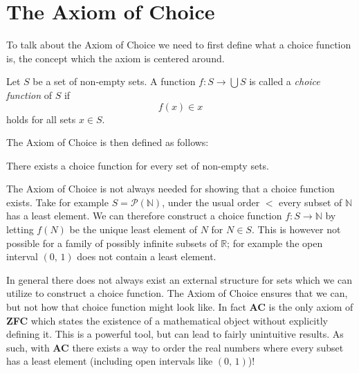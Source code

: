 \documentclass[../../main.tex]{subfiles}
\begin{document}
\section{The Axiom of Choice}
To talk about the Axiom of Choice we need to first define what a choice function is, the concept which the axiom is centered around.
\begin{definition}\cite[p.38]{Jec78}
    Let $S$ be a set of non-empty sets.
    A function $f: S \to \bigcup S$ is called a \textit{choice function} of $S$ if
    $$f(x) \in x$$
    holds for all sets $x \in S$.
\end{definition}
The Axiom of Choice is then defined as follows:
\begin{definition}\cite[p.38]{Jec78}\label{choice-axiom}
    There exists a choice function for every set of non-empty sets.
\end{definition}

The Axiom of Choice is not always needed for showing that a choice function exists.
Take for example $S = \mathcal{P}(\mathbb{N})$, under the usual order $<$ every subset of $\mathbb{N}$ has a least element.
We can therefore construct a choice function $f: S \to \mathbb{N}$ by letting $f(N)$ be the unique least element of $N$ for $N \in S$.
This is however not possible for a family of possibly infinite subsets of $\mathbb{R}$; for example the open interval $\left(0,\, 1\right)$ does not contain a least element.

In general there does not always exist an external structure for sets which we can utilize to construct a choice function.
The Axiom of Choice ensures that we can, but not how that choice function might look like.
In fact \textbf{AC} is the only axiom of \textbf{ZFC} which states the existence of a mathematical object without explicitly defining it.
This is a powerful tool, but can lead to fairly unintuitive results. 
As such, with \textbf{AC} there exists a way to order the real numbers where every subset has a least element (including open intervals like $\left(0,\, 1\right)$)!
\end{document}
